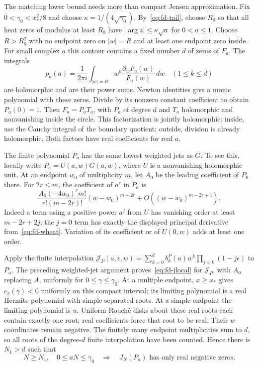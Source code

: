 The matching lower bound needs more than compact Jensen approximation.
Fix $0<\gamma_0<x_*^2/8$ and choose
$\kappa=1/(4\sqrt{\gamma_0})$.
By~\eqref{eq:fd-tail}, choose $R_0$ so that all heat zeros of modulus
at least $R_0$ have $|\arg z|\le\kappa\sqrt a$ for $0<a\le1$.
Choose $R>R_0^2$ with no endpoint zero on $|w|=R$ and at least one
endpoint zero inside.  For small complex $a$ this contour contains
a fixed number $d$ of zeros of $F_a$.
The integrals
\[
 p_k(a)=\frac1{2\pi i}\int_{|w|=R}
             w^k\frac{\partial_wF_a(w)}{F_a(w)}\,dw
 \quad(1\le k\le d)
\]
are holomorphic and are their power sums.  Newton identities give a
monic polynomial with these zeros.  Divide by its nonzero constant
coefficient to obtain $P_a(0)=1$.
Then $F_a=P_a T_a$, with $P_a$ of degree $d$ and $T_a$ holomorphic
and nonvanishing inside the circle.  This factorization is jointly
holomorphic: inside, use the Cauchy integral of the boundary quotient;
outside, division is already holomorphic.  Both factors have real
coefficients for real $a$.

The finite polynomial $P_a$ has the same lowest weighted jets as $G$.
To see this, locally write $P_a=U(a,w)G(a,w)$, where $U$ is a
nonvanishing holomorphic unit.  At an endpoint $w_0$ of multiplicity
$m$, let $A_0$ be the leading coefficient of $P_0$ there.
For $2r\le m$, the coefficient of $a^r$ in $P_a$ is
\[
 \frac{A_0(-4w_0)^r m!}{r!(m-2r)!}(w-w_0)^{m-2r}
       +O((w-w_0)^{m-2r+1}).
\]
Indeed a term using a positive power $a^j$ from $U$ has vanishing
order at least $m-2r+2j$; the $j=0$ term has exactly the displayed
principal derivative from~\eqref{eq:fd-wheat}.  Variation of its
coefficient or of $U(0,w)$ adds at least one order.

Apply the finite interpolation
$\mathcal J_P(a,\epsilon,w)=\sum_{k=0}^d b_k^{P}(a)w^k
\prod_{j<k}(1-j\epsilon)$ to $P_a$.
The preceding weighted-jet argument proves~\eqref{eq:fd-jlocal}
for $\mathcal J_P$, with $A_0$ replacing $A$, uniformly for
$0\le\gamma\le\gamma_0$.
At a multiple endpoint, $x\ge x_*$ gives
$c_x(\gamma)<0$ uniformly on this compact interval; its limiting
polynomial is a real Hermite polynomial with simple separated roots.
At a simple endpoint the limiting polynomial is $u$.
Uniform Rouch\'e disks about these real roots each contain exactly
one root; real coefficients force that root to be real.  Their
$w$ coordinates remain negative.  The finitely many endpoint
multiplicities sum to $d$, so all roots of the degree-$d$ finite
interpolation have been counted.  Hence there is $N_1>d$ such that
\[
 N\ge N_1,\quad 0\le aN\le\gamma_0
 \quad\Longrightarrow\quad
 J_N(P_a)\text{ has only real negative zeros}.
\]

